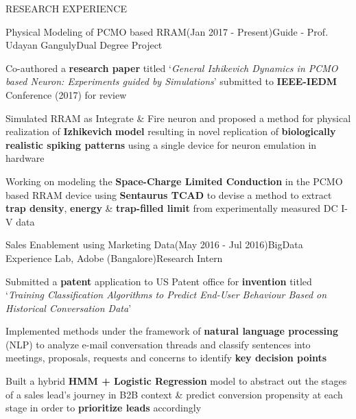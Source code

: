 \documentclass{resume} %
\begin{document}
\begin{rSection}{RESEARCH EXPERIENCE}

\begin{rSubsection}{Physical Modeling of PCMO based RRAM}{(Jan 2017 - Present)}{Guide - Prof. Udayan Ganguly}{Dual Degree Project \hspace{0.2 cm}} 
\item Co-authored a \textbf{research paper} titled `\textit{General Izhikevich Dynamics in PCMO based Neuron: Experiments guided by Simulations}' submitted to \textbf{IEEE-IEDM} Conference (2017) for review
\item Simulated RRAM as Integrate \& Fire neuron and proposed a method for physical realization of \textbf{Izhikevich} \textbf{model} resulting in novel replication of \textbf{biologically realistic spiking patterns} using a single device for neuron emulation in hardware
\item Working on modeling the \textbf{Space-Charge Limited Conduction} in the PCMO based RRAM device using \textbf{Sentaurus TCAD} to devise a method to extract \textbf{trap density}, \textbf{energy} \& \textbf{trap-filled limit} from experimentally measured DC I-V data 
\end{rSubsection} 


\vspace{-0.2em}
\begin{rSubsection}{Sales Enablement using Marketing Data}{(May 2016 - Jul 2016)}{BigData Experience Lab, Adobe (Bangalore)}{Research Intern \hspace{0.2 cm}} 
\item Submitted a \textbf{patent} application to US Patent office for \textbf{invention} titled `\textit{Training Classification Algorithms to Predict End-User Behaviour Based on Historical Conversation Data}'
\item Implemented methods under the framework of \textbf{natural language processing} (NLP) to analyze e-mail conversation threads and classify sentences into meetings, proposals, requests and concerns to identify \textbf{key decision points}
\item Built a hybrid \textbf{HMM + Logistic Regression} model to abstract out the stages of a sales lead's journey in B2B context \& predict conversion propensity at each stage in order to \textbf{prioritize leads} accordingly
\end{rSubsection}

\end{rSection}
\end{document}
